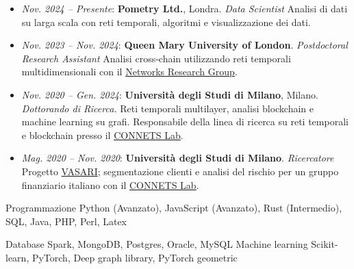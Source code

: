 \documentclass[11pt, a4paper]{awesome-cv}
\begin{document}
\begin{refsection}

\begin{itemize}
    \item \textit{Nov. 2024 – Presente}: \textbf{Pometry Ltd.}, Londra. \textit{Data Scientist}  
    Analisi di dati su larga scala con reti temporali, algoritmi e visualizzazione dei dati.  

    \item \textit{Nov. 2023 – Nov. 2024}: \textbf{Queen Mary University of London}. \textit{Postdoctoral Research Assistant}
    Analisi cross‑chain utilizzando reti temporali multidimensionali con il \underline{\href{https://networks.eecs.qmul.ac.uk/}{Networks Research Group}}.

    \item \textit{Nov. 2020 – Gen. 2024}: \textbf{Università degli Studi di Milano}, Milano. \textit{Dottorando di Ricerca.}
    Reti temporali multilayer, analisi blockchain e machine learning su grafi. Responsabile della linea di ricerca su reti temporali e blockchain presso il \underline{\href{https://connets.di.unimi.it/}{CONNETS Lab}}.

    \item \textit{Mag. 2020 – Nov. 2020}: \textbf{Università degli Studi di Milano}. \textit{Ricercatore}  
    Progetto \href{https://www.vasariartexperience.it/}{VASARI}; segmentazione clienti e analisi del rischio per un gruppo finanziario italiano con il \underline{\href{https://connets.di.unimi.it/}{CONNETS Lab}}.  
\end{itemize}




\begin{cvskills}
  \cvskill
    {Programmazione} %
    {Python (Avanzato), JavaScript (Avanzato), Rust (Intermedio), SQL, Java, PHP, Perl, Latex } %
    

  \cvskill
    {Database} %
    {Spark, MongoDB, Postgres, Oracle, MySQL} %
  \cvskill
    {Machine learning} %
    {Scikit-learn, PyTorch, Deep graph library, PyTorch geometric} %


\end{cvskills}
\end{refsection}
\end{document}
